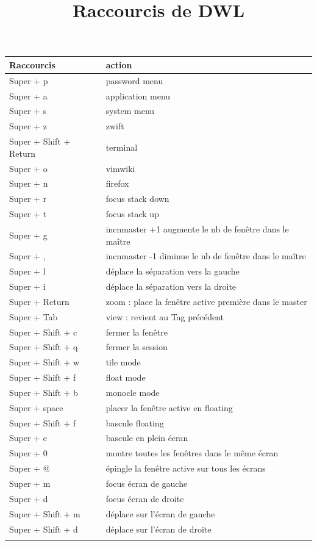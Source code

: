 \documentclass[12pt,letterpaper]{article}
\date{}
\title{Raccourcis de DWL}
\begin{document}
\maketitle
\begin{center}
\begin{tabular}{ll}
Raccourcis & action\\
\hline
Super + p & password menu\\
Super + a & application menu\\
Super + s & system menu\\
Super + z & zwift\\
Super + Shift + Return & terminal\\
Super + o & vimwiki\\
Super + n & firefox\\
Super + r & focus stack down\\
Super + t & focus stack up\\
Super + g & incnmaster +1 augmente le nb de fenêtre dans le maître\\
Super + , & incnmaster -1 diminue le nb de fenêtre dans le maître\\
Super + l & déplace la séparation vers la gauche\\
Super + i & déplace la séparation vers la droite\\
Super + Return & zoom : place la fenêtre active première dans le master\\
Super + Tab & view : revient au Tag précédent\\
Super + Shift + c & fermer la fenêtre\\
Super + Shift + q & fermer la session\\
Super + Shift + w & tile mode\\
Super + Shift + f & float mode\\
Super + Shift + b & monocle mode\\
Super + space & placer la fenêtre active en floating\\
Super + Shift + f & bascule floating\\
Super + e & bascule en plein écran\\
Super + 0 & montre toutes les fenêtres dans le même écran\\
Super + @ & épingle la fenêtre active sur tous les écrans\\
Super + m & focus écran de gauche\\
Super + d & focus écran de droite\\
Super + Shift + m & déplace sur l'écran de gauche\\
Super + Shift + d & déplace sur l'écran de droite\\
 & \\
\end{tabular}
\end{center}
\end{document}
